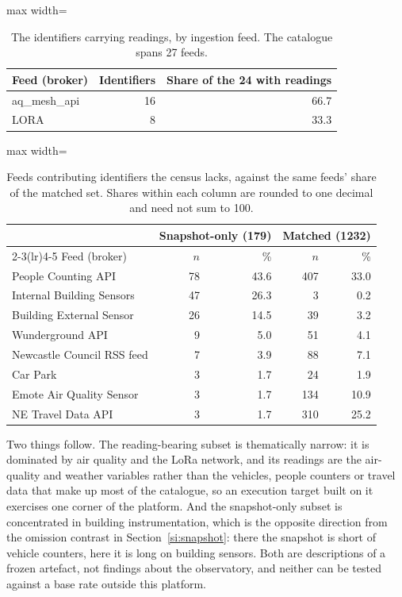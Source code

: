 \documentclass[fleqn,10pt]{wlpeerj}
\begin{document}
\begin{table}[H]
\centering
\caption{The identifiers carrying readings, by ingestion feed. The catalogue spans
27 feeds.}
\label{si:rbbroker}
\small
\begin{adjustbox}{max width=\linewidth}
\begin{tabular}{lrr}
\toprule
Feed (broker) & Identifiers & Share of the 24 with readings \\
\midrule
aq\_mesh\_api & 16 & 66.7 \\
LORA & 8 & 33.3 \\
\bottomrule
\end{tabular}
\end{adjustbox}
\end{table}

\begin{table}[H]
\centering
\caption{Feeds contributing identifiers the census lacks, against the same feeds' share of the
matched set. Shares within each column are rounded to one decimal and need not sum to 100.}
\label{si:snapbroker}
\small
\begin{adjustbox}{max width=\linewidth}
\begin{tabular}{lrrrr}
\toprule
 & \multicolumn{2}{c}{Snapshot-only (179)} & \multicolumn{2}{c}{Matched (1232)} \\
\cmidrule(lr){2-3}\cmidrule(lr){4-5}
Feed (broker) & $n$ & \% & $n$ & \% \\
\midrule
People Counting API & 78 & 43.6 & 407 & 33.0 \\
Internal Building Sensors & 47 & 26.3 & 3 & 0.2 \\
Building External Sensor & 26 & 14.5 & 39 & 3.2 \\
Wunderground API & 9 & 5.0 & 51 & 4.1 \\
Newcastle Council RSS feed & 7 & 3.9 & 88 & 7.1 \\
Car Park & 3 & 1.7 & 24 & 1.9 \\
Emote Air Quality Sensor & 3 & 1.7 & 134 & 10.9 \\
NE Travel Data API & 3 & 1.7 & 310 & 25.2 \\
\bottomrule
\end{tabular}
\end{adjustbox}
\end{table}

Two things follow. The reading-bearing subset is thematically narrow: it is dominated by air
quality and the LoRa network, and its readings are the air-quality and weather variables rather
than the vehicles, people counters or travel data that make up most of the catalogue, so an
execution target built on it exercises one corner of the platform. And the snapshot-only subset
is concentrated in building instrumentation, which is the opposite direction from the omission
contrast in Section~\ref{si:snapshot}: there the snapshot is short of vehicle counters, here it
is long on building sensors. Both are descriptions of a frozen artefact, not findings about the
observatory, and neither can be tested against a base rate outside this platform.
\end{document}
